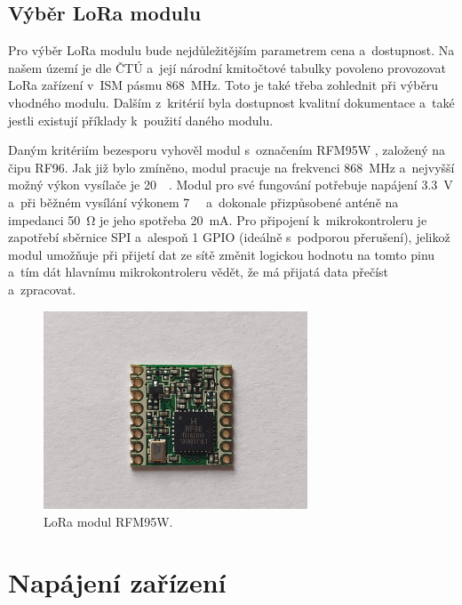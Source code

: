 \subsection{Výběr LoRa modulu}

Pro výběr LoRa modulu bude nejdůležitějším parametrem cena a~dostupnost. Na našem území je dle ČTÚ a~její národní kmitočtové tabulky \cite{kmitoctovaTabulka} povoleno provozovat LoRa zařízení v~ISM pásmu \SI{868}{MHz}. Toto je také třeba zohlednit při výběru vhodného modulu. Dalším z~kritérií byla dostupnost kvalitní dokumentace a~také jestli existují příklady k~použití daného modulu.

\DeclareSIUnit {}   %
Daným kritériím bezesporu vyhověl modul s~označením RFM95W \cite{dat_RFM95W}, založený na čipu RF96. Jak již bylo zmíněno, modul pracuje na frekvenci \SI{868}{\mega\hertz} a~nejvyšší možný výkon vysílače je \SI{20}{\deci\belm}. Modul pro své fungování potřebuje napájení \SI{3,3}{\volt} a~při běžném vysílání výkonem \SI{+7}{\deci\belm} a~dokonale přizpůsobené anténě na impedanci \SI{50}{\ohm} je jeho spotřeba \SI{20}{\milli\ampere}. Pro připojení k~mikrokontroleru je zapotřebí sběrnice SPI a~alespoň 1 GPIO (ideálně s~podporou přerušení), jelikož modul umožňuje při přijetí dat ze sítě změnit logickou hodnotu na tomto pinu a~tím dát hlavnímu mikrokontroleru vědět, že má přijatá data přečíst a~zpracovat. 

\begin{figure}[h]
    \centering
    \includegraphics[width=0.7\textwidth]{obrazky/rfm95w.jpg}
    \caption{LoRa modul RFM95W.}
    \label{fig_RFM95W}
\end{figure}

\section{Napájení zařízení}


